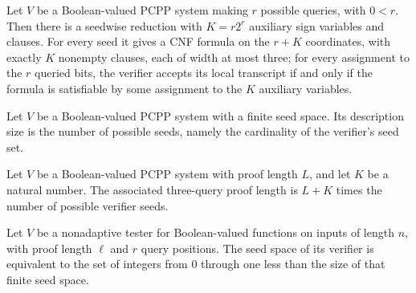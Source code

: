 \begin{definition}
\label{FABL.positiveSeedwiseThreeCNFReduction}
\leanok
{}
Let $V$ be a Boolean-valued PCPP system making $r$ possible queries, with $0<r$. Then
there is a seedwise reduction with $K=r2^r$ auxiliary sign variables and clauses. For
every seed it gives a CNF formula on the $r+K$ coordinates, with exactly $K$ nonempty
clauses, each of width at most three; for every assignment to the $r$ queried bits, the
verifier accepts its local transcript if and only if the formula is satisfiable by some
assignment to the $K$ auxiliary variables.
\end{definition}

\begin{definition}
\label{FABL.PCPPSystem.descriptionSize}
\leanok
{}
Let $V$ be a Boolean-valued PCPP system with a finite seed space. Its description size
is the number of possible seeds, namely the cardinality of the verifier's seed set.
\end{definition}

\begin{definition}
\label{FABL.threeQueryProofLength}
\leanok
{}
Let $V$ be a Boolean-valued PCPP system with proof length $L$, and let $K$ be a natural
number. The associated three-query proof length is $L+K$ times the number of possible
verifier seeds.
\end{definition}

\begin{definition}
\label{FABL.PCPPSystem.seedIndexEquiv}
\leanok
{}
Let $V$ be a nonadaptive tester for Boolean-valued functions on inputs of length $n$,
with proof length $\ell$ and $r$ query positions. The seed space of its verifier is
equivalent to the set of integers from $0$ through one less than the size of that finite
seed space.
\end{definition}


